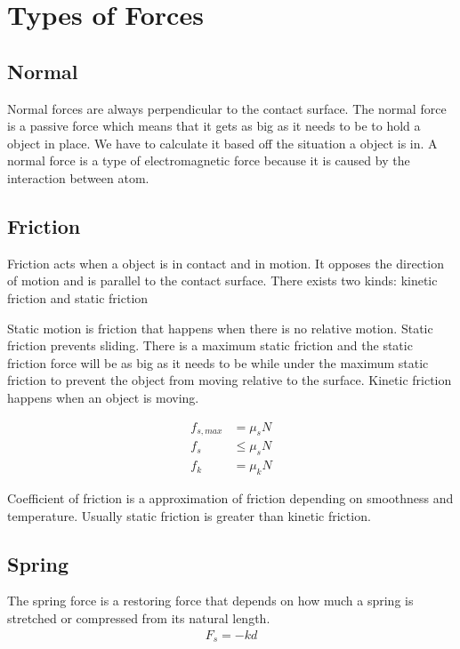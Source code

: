 \documentclass{article}
\theoremstyle{mytheoremstyle}
\theoremstyle{mytheoremstyle}
\theoremstyle{myproblemstyle}
\begin{document}
    \section*{Types of Forces}
    \subsection*{Normal}
    Normal forces are always perpendicular to the contact surface. The normal
    force is a passive force which means that it gets as big as it needs to be
    to hold a object in place. We have to calculate it based off the situation a
    object is in. A normal force is a type of electromagnetic force because it
    is caused by the interaction between atom.

    \subsection*{Friction}
    Friction acts when a object is in contact and in motion. It opposes the
    direction of motion and is parallel to the contact surface. There exists two
    kinds: kinetic friction and static friction

    Static motion is friction that happens when there is no relative motion.
    Static friction prevents sliding. There is a maximum static friction and the
    static friction force will be as big as it needs to be while under the
    maximum static friction to prevent the object from moving relative to the
    surface.
    Kinetic friction happens when an object is moving.

    \begin{align*}
        f_{s,max} &= \mu_s N \\
        f_s       &\le \mu_s N \\
        f_k       &= \mu_k N
    \end{align*}

    Coefficient of friction is a approximation of friction depending on
    smoothness and temperature. Usually static friction is greater than kinetic
    friction.

    \subsection*{Spring}
    The spring force is a restoring force that depends on how much a spring is
    stretched or compressed from its natural length.
    \begin{align*}
        F_s = -kd
    \end{align*}
\end{document}
